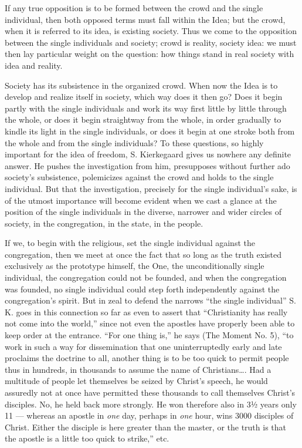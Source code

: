 \documentclass[12pt,a4paper,openany]{book}
\newcommand{\opage}[1]{\marginnote{\footnotesize\textit{[#1]}}}
\begin{document}
If any true opposition is to be formed between
the crowd and the single individual, then both opposed
terms must fall within the Idea; but the crowd, when it is referred
to its idea, is existing society. Thus
we come to the opposition between the single individuals and
society; crowd is reality, society idea: we
must then lay particular weight on the question: how
things stand in real society with idea
and reality.

Society has its subsistence in the organized
crowd. When now the Idea is to develop and realize
itself in society, which way does it then go? Does it begin
partly with the single individuals and work its way first little by little
through the whole, or does it begin straightway
from the whole, in order gradually to kindle its light in
the single individuals, or does it begin at one stroke both from
the whole and from the single individuals? To these questions, so highly
important for the idea of freedom, S. Kierkegaard
gives us nowhere any definite answer. He pushes the investigation
from him, presupposes without further ado society's
subsistence, polemicizes against the crowd and holds to the
single individual. But that the investigation, precisely for the single individual's
sake, is of the utmost importance will become evident when
we cast a glance at the position of the single individuals in the diverse,
narrower and wider circles of society, in the congregation,
in the state, in the people.

If we, to begin with the religious, set the single individual
against the congregation, then we meet at once the fact
that so long as the truth existed exclusively as
\setcounter{footnote}{0}%
\opage{31}the prototype himself, the One, the unconditionally single individual,
the congregation could not be founded, and when the congregation was
founded, no single individual could step forth independently against the congregation's
spirit. But in zeal to defend the narrows
``the single individual'' S. K. goes in this connection so far
as even to assert that ``Christianity has really
not come into the world,'' since not even the apostles
have properly been able to keep order at the entrance. ``For
one thing is,'' he says (The Moment No. 5), ``to work in such a way
for dissemination that one uninterruptedly early and late proclaims
the doctrine to all, another thing is to be too quick
to permit people thus in hundreds, in thousands to assume the
name of Christians\dots{}. Had a multitude of people
let themselves be seized by Christ's speech, he would
assuredly not at once have permitted these thousands to call themselves Christ's
disciples. No, he held back more strongly. He won
therefore also in 3½ years only 11 --- whereas an apostle
in \emph{one} day, perhaps in \emph{one} hour, wins 3000 disciples of Christ.
Either the disciple is here greater than the master, or the truth
is that the apostle is a little too quick to strike,''
etc.
\end{document}
